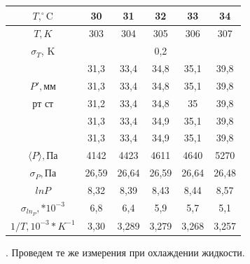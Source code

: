 \documentclass[a4paper,12pt]{article} %
\begin{document}
\begin{tabular}{|c|c|c|c|c|c|}
\hline 
$T, ^\circ \text{C}$ & 30 & 31 & 32 & 33 & 34 \\ 
\hline 
$T, K$ & 303 & 304 & 305 & 306 & 307 \\ 
\hline 
$\sigma_T$, K & \multicolumn{5}{c|}{0,2} \\ 
\hline 
 & 31,3 & 33,4 & 34,8 & 35,1 & 39,8 \\ 
\hhline{~-----} 
$P', \text{мм}$ & 31,3 & 33,4 & 34,8 & 35,1 & 39,8	 \\ 
\hhline{~-----}  
$\text{рт ст}$ & 31,2 & 33,4 & 34,8 & 35 & 39,8 \\ 
\hhline{~-----} 
 & 31,3 & 33,4 & 34,9 & 35,1 & 39,8 \\ 
\hhline{~-----} 
 & 31,3 & 33,4 & 34,9 & 35,1 & 39,8 \\ 
\hline 
$\langle P \rangle, \text{Па} $ & 4142 & 4423 & 4611 & 4640 & 5270 \\ 
\hline 
$\sigma_P, \text{Па}$ & 26,59 & 26,64 & 26,59 & 26,64 & 26,48 \\ 
\hline 
$ln{P}$ & 8,32 & 8,39 & 8,43 & 8,44 & 8,57 \\ 
\hline 
$\sigma_{ln_P}, *10^{-3}$ & 6,8 & 6,4 & 5,9 & 5,7 & 5,1 \\ 
\hline 
$1/T, 10^{-3}*K^{-1}$ & 3,30 & 3,289 & 3,279 & 3,268 & 3,257 \\ 
\hline 
\end{tabular}

\medskip
\medskip

. Проведем те же измерения при охлаждении жидкости.

\medskip
\end{document}

